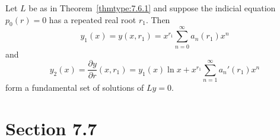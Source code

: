 \setcounter{theorem}{1}
\setcounter{equation}{7}
\begin{theorem}
  \label{thmtype:7.6.2} Let $L$ be as in Theorem~{\rm\ref{thmtype:7.6.1}} and suppose the indicial
  equation $p_{0}(r)=0$ has a repeated real root $r_{1}$. Then
  \[
    y_{1}(x)=y(x,r_{1})=x^{r_{1}}\sum_{n=0}^{\infty}a_{n}(r_{1})x^{n}
  \]
  and
  \begin{equation}
    \label{eq:7.6.8}y_{2}(x)=\frac{\partial y}{\partial r}(x,r_{1})=y_{1}(x)\ln x+x^{r_{1}}\sum_{n=1}^{\infty}a_{n}'(r_{1})x^{n}
  \end{equation}
  form a fundamental set of solutions of $Ly=0$.
\end{theorem}

\section*{Section 7.7}
\setcounter{chapter}{7}
\setcounter{section}{7}

